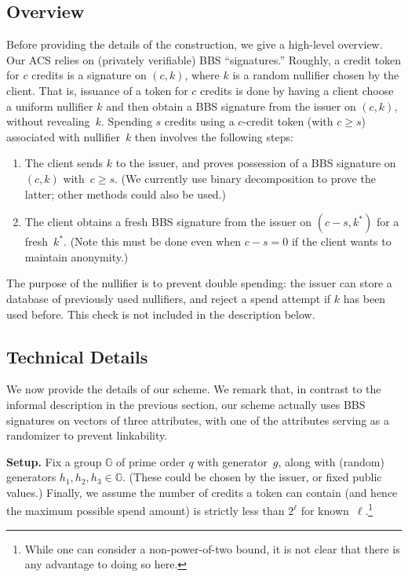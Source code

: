 \documentclass[11pt]{article}
\def\G{{\mathbb G}}
\begin{document}
\subsection{Overview}
Before providing the details of the construction, we give a high-level overview.
Our ACS relies on (privately verifiable) BBS ``signatures.''  
Roughly, a credit token for $c$ credits is a signature on $(c, k)$, where $k$ is a random nullifier chosen by the client. That is, issuance of a token for $c$ credits is done by having a client choose a uniform nullifier $k$ and then obtain a BBS signature from the issuer on $(c, k)$, without revealing~$k$.
Spending $s$ credits using a $c$-credit token (with $c \geq s$) associated with nullifier~$k$ then involves the following steps:
\begin{enumerate}
    \item The client sends $k$ to the issuer, and proves possession of a BBS signature on $(c, k)$ with~$c \geq s$. (We currently use binary decomposition to prove the latter; other methods could also be used.)
    \item The client obtains a fresh BBS signature from the issuer on $(c-s, k^*)$ for a fresh~$k^*$. (Note this must be done even when $c-s=0$ if the client wants to maintain anonymity.)
\end{enumerate}
The purpose of the nullifier is to prevent double spending: the issuer can store a database of previously used nullifiers, and reject a spend attempt if $k$ has been used before. This check is not included in the description below.

\subsection{Technical Details}
We now provide the details of our scheme. We remark that, in contrast to the informal description in the previous section, our scheme actually uses BBS signatures on vectors of three attributes, with one of the attributes serving as a randomizer to prevent linkability.

\medskip\noindent
{\bf Setup.}
Fix a group $\G$ of prime order $q$ with generator~$g$, along with
(random) generators $h_1, h_2, h_3 \in \G$. (These could be chosen by the issuer, or fixed public values.) 
Finally, we assume the number of credits a token can contain (and hence the maximum possible spend amount) is strictly less than $2^\ell$ for known~$\ell$.\footnote{While one can consider a non-power-of-two bound, it is not clear that there is any advantage to doing so here.}
\end{document}
